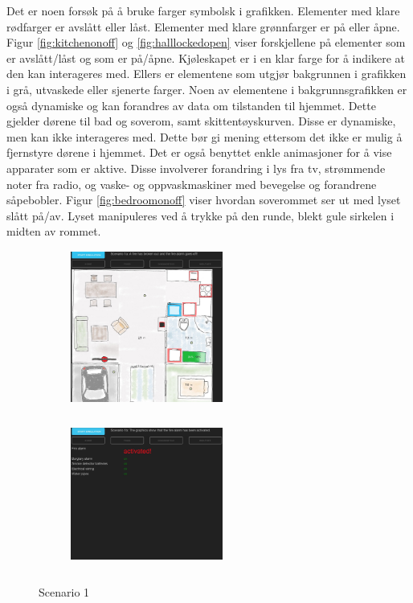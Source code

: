 Det er noen forsøk på å bruke farger symbolsk i grafikken. Elementer med klare rødfarger er avslått eller låst. Elementer med klare grønnfarger er på eller åpne. Figur \ref{fig:kitchenonoff} og \ref{fig:halllockedopen} viser forskjellene på elementer som er avslått/låst og som er på/åpne. Kjøleskapet er i en klar farge for å indikere at den kan interageres med. Ellers er elementene som utgjør bakgrunnen i grafikken i grå, utvaskede eller sjenerte farger. Noen av elementene i bakgrunnsgrafikken er også dynamiske og kan forandres av data om tilstanden til hjemmet. Dette gjelder dørene til bad og soverom, samt skittentøyskurven. Disse er dynamiske, men kan ikke interageres med. Dette bør gi mening ettersom det ikke er mulig å fjernstyre dørene i hjemmet. Det er også benyttet enkle animasjoner for å vise apparater som er aktive. Disse involverer forandring i lys fra tv, strømmende noter fra radio, og vaske- og oppvaskmaskiner med bevegelse og forandrene såpebobler. Figur \ref{fig:bedroomonoff} viser hvordan soverommet ser ut med lyset slått på/av. Lyset manipuleres ved å trykke på den runde, blekt gule sirkelen i midten av rommet.
\begin{figure}[ht]
\centering
\begin{subfigure}{0.32\textwidth}
\centering
\includegraphics[width=5cm, height=5cm]{fig/scenario1a}
\caption{}
\label{fig:1a}
\end{subfigure}
\begin{subfigure}{0.32\textwidth}
\centering
\includegraphics[width=5cm, height=5cm]{fig/scenario1b}
\caption{}
\label{fig:1b}
\end{subfigure}
\caption{Scenario 1}
\label{fig:scenario1}
\end{figure}
